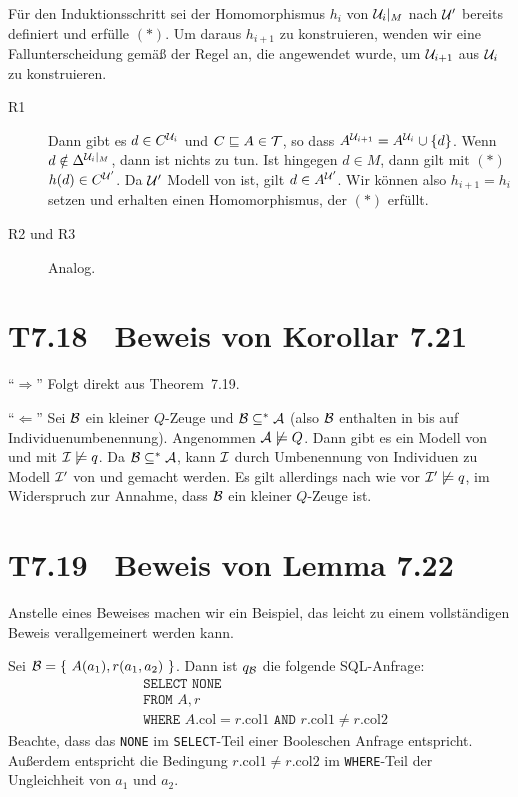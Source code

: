 \documentclass[fontsize=11pt, twoside=false, numbers=autoenddot]{scrbook}
\begin{document}
Für den Induktionsschritt sei der Homomorphismus $h_i$ von $\mathcal{U}_i|_M$ nach $\mathcal{U}'$
bereits definiert und erfülle $(*)$.
Um daraus $h_{i+1}$ zu konstruieren, wenden wir eine Fallunterscheidung gemäß
der Regel an, die angewendet wurde, um $\mathcal{U}_{i+1}$ aus $\mathcal{U}_i$ zu
konstruieren.
%
\begin{description}
  \item[\textsf{R1}]
    Dann gibt es $d \in C^{\mathcal{U}_i}$ und $C \sqsubseteq A \in \mathcal{T}$,
    so dass $A^{\mathcal{U}_{i+1}} = A^{\mathcal{U}_i} \cup \{d\}$.
    Wenn $d \notin \Delta^{\mathcal{U}_i|_M}$, dann ist nichts zu tun.
    Ist hingegen $d \in M$, dann gilt mit $(*)$ $h(d) \in C^{\mathcal{U}'}$.
    Da $\mathcal{U}'$ Modell von \Tmc ist, gilt $d \in A^{\mathcal{U}'}$.
    Wir können also $h_{i+1} = h_i$ setzen
    und erhalten einen Homomorphismus, der $(*)$ erfüllt.
  \item[\textsf{R2} und \textsf{R3}]
    Analog.
    \qedhere
\end{description}


\section*{T7.18~ Beweis von Korollar 7.21}

``$\Rightarrow$'' Folgt direkt aus Theorem~7.19.

\smallskip

``$\Leftarrow$'' Sei $\mathcal{B}$ ein kleiner $Q$-Zeuge und $\mathcal{B}\subseteq^*
\mathcal{A}$ (also $\mathcal{B}$ enthalten in \Amc bis auf Individuenumbenennung).
Angenommen $\mathcal{A}\not\models Q$. Dann gibt es ein Modell \Imc von \Amc
und \Tmc mit $\mathcal{I}\not\models q$. Da $\mathcal{B}\subseteq^*\mathcal{A}$, kann
$\mathcal{I}$ durch Umbenennung von Individuen zu Modell $\mathcal{I}'$ von \Bmc und
\Tmc gemacht werden. Es gilt allerdings nach wie vor $\mathcal{I}'\not\models
q$, im Widerspruch zur Annahme, dass $\mathcal{B}$ ein kleiner $Q$-Zeuge ist. 


\section*{T7.19~ Beweis von Lemma 7.22}

Anstelle eines Beweises machen wir ein Beispiel, das leicht zu einem
vollständigen Beweis verallgemeinert werden kann.

Sei $\Bmc=\{\ A(a_1), r(a_1,a_2)\ \}$. Dann ist $q_\mathcal{B}$ die folgende
SQL-Anfrage: 
%
\begin{align*}
  & \texttt{SELECT NONE} \\
  & \texttt{FROM } A,r \\
  & \texttt{WHERE } A.\text{col} = r.\text{col1} \texttt{ AND }
  r.\text{col1} \neq r.\text{col2}
\end{align*}
%
Beachte, dass das \texttt{NONE} im \texttt{SELECT}-Teil einer Booleschen 
Anfrage entspricht. Außerdem entspricht die Bedingung $r.\text{col1} \neq
r.\text{col2}$ im \texttt{WHERE}-Teil der Ungleichheit von $a_1$ und
$a_2$.
  
\end{document}
